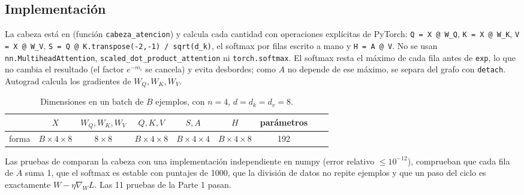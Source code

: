 \documentclass[10pt]{article}
\begin{document}
\subsection{Implementación}
\begin{sloppypar}
La cabeza está en  (función \texttt{cabeza\_atencion}) y calcula cada
cantidad con operaciones explícitas de PyTorch: \texttt{Q = X @ W\_Q}, \texttt{K = X @ W\_K},
\texttt{V = X @ W\_V}, \texttt{S = Q @ K.transpose(-2,-1) / sqrt(d\_k)}, el softmax por filas escrito
a mano y \texttt{H = A @ V}. No se usan \texttt{nn.MultiheadAttention},
\texttt{scaled\_dot\_product\_attention} ni \texttt{torch.softmax}. El softmax resta el máximo de cada
fila antes de \texttt{exp}, lo que no cambia el resultado (el factor $e^{-m_i}$ se cancela) y evita
desbordes; como $A$ no depende de ese máximo, se separa del grafo con \texttt{detach}. Autograd
calcula los gradientes de $W_Q, W_K, W_V$.
\end{sloppypar}

\begin{table}[H]
  \centering\small
  \caption{Dimensiones en un batch de $B$ ejemplos, con $n=4$, $d=d_k=d_v=8$.}
  \label{tab:dims}
  \begin{tabular}{lcccccccc}
    \toprule
    & $X$ & $W_Q, W_K, W_V$ & $Q, K, V$ & $S, A$ & $H$ & parámetros \\
    \midrule
    forma & $B\times4\times8$ & $8\times8$ & $B\times4\times8$ & $B\times4\times4$ & $B\times4\times8$ & 192 \\
    \bottomrule
  \end{tabular}
\end{table}

Las pruebas de  comparan la cabeza con una implementación
independiente en numpy (error relativo $\le 10^{-12}$), comprueban que cada fila de $A$ suma 1, que
el softmax es estable con puntajes de 1000, que la división de datos no repite ejemplos y que un paso
del ciclo es exactamente $W - \eta\nabla_W L$. Las 11 pruebas de la Parte 1 pasan.
\end{document}
